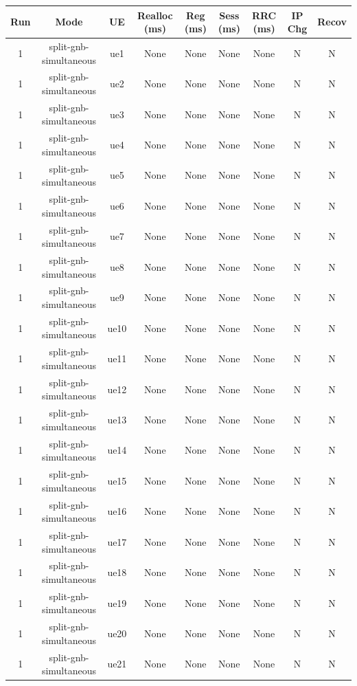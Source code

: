 \begin{table}[ht]
\centering
\begin{tabular}{|c|c|c|c|c|c|c|c|c|}
\hline
Run & Mode & UE & Realloc (ms) & Reg (ms) & Sess (ms) & RRC (ms) & IP Chg & Recov \\
\hline
1 & split-gnb-simultaneous & ue1 & None & None & None & None & N & N \\
1 & split-gnb-simultaneous & ue2 & None & None & None & None & N & N \\
1 & split-gnb-simultaneous & ue3 & None & None & None & None & N & N \\
1 & split-gnb-simultaneous & ue4 & None & None & None & None & N & N \\
1 & split-gnb-simultaneous & ue5 & None & None & None & None & N & N \\
1 & split-gnb-simultaneous & ue6 & None & None & None & None & N & N \\
1 & split-gnb-simultaneous & ue7 & None & None & None & None & N & N \\
1 & split-gnb-simultaneous & ue8 & None & None & None & None & N & N \\
1 & split-gnb-simultaneous & ue9 & None & None & None & None & N & N \\
1 & split-gnb-simultaneous & ue10 & None & None & None & None & N & N \\
1 & split-gnb-simultaneous & ue11 & None & None & None & None & N & N \\
1 & split-gnb-simultaneous & ue12 & None & None & None & None & N & N \\
1 & split-gnb-simultaneous & ue13 & None & None & None & None & N & N \\
1 & split-gnb-simultaneous & ue14 & None & None & None & None & N & N \\
1 & split-gnb-simultaneous & ue15 & None & None & None & None & N & N \\
1 & split-gnb-simultaneous & ue16 & None & None & None & None & N & N \\
1 & split-gnb-simultaneous & ue17 & None & None & None & None & N & N \\
1 & split-gnb-simultaneous & ue18 & None & None & None & None & N & N \\
1 & split-gnb-simultaneous & ue19 & None & None & None & None & N & N \\
1 & split-gnb-simultaneous & ue20 & None & None & None & None & N & N \\
1 & split-gnb-simultaneous & ue21 & None & None & None & None & N & N \\

\end{tabular}
\end{table}
